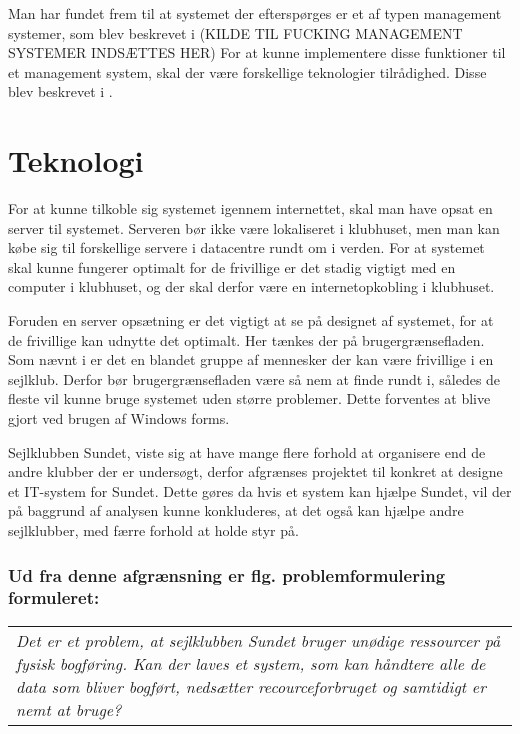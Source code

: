 Man har fundet frem til at systemet der efterspørges er et af typen management systemer, som blev beskrevet i (KILDE TIL FUCKING MANAGEMENT SYSTEMER INDSÆTTES HER)
For at kunne implementere disse funktioner til et management system, skal der være forskellige teknologier tilrådighed. Disse blev beskrevet i .

\section{Teknologi}

For at kunne tilkoble sig systemet igennem internettet, skal man have opsat en server til systemet. Serveren bør ikke være lokaliseret i klubhuset, men man kan købe sig til forskellige servere i datacentre rundt om i verden. For at systemet skal kunne fungerer optimalt for de frivillige er det stadig vigtigt med en computer i klubhuset, og der skal derfor være en internetopkobling i klubhuset.

Foruden en server opsætning er det vigtigt at se på designet af systemet, for at de frivillige kan udnytte det optimalt. Her tænkes der på brugergrænsefladen. Som nævnt i  er det en blandet gruppe af mennesker der kan være frivillige i en sejlklub. Derfor bør brugergrænsefladen være så nem at finde rundt i, således de fleste vil kunne bruge systemet uden større problemer. Dette forventes at blive gjort ved brugen af Windows forms.

Sejlklubben Sundet, viste sig at have mange flere forhold at organisere end de andre klubber der er undersøgt, derfor afgrænses projektet til konkret at designe et IT-system for Sundet. Dette gøres da hvis et system kan hjælpe Sundet, vil der på baggrund af analysen kunne konkluderes, at det også kan hjælpe andre sejlklubber, med færre forhold at holde styr på. 

\subsubsection*{Ud fra denne afgrænsning er flg. problemformulering formuleret:}
\begin{center}
\begin{tabular}{|p{14cm}|}
\textit{Det er et problem, at sejlklubben Sundet bruger unødige ressourcer på fysisk bogføring. Kan der laves et system, som kan håndtere alle de data som bliver bogført, nedsætter recourceforbruget og samtidigt er nemt at bruge? }
\end{tabular}
\end{center}
